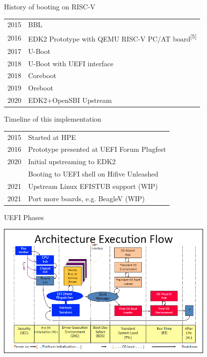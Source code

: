 \documentclass[
  10pt
]{beamer}
\begin{document}

% 

\begin{frame}{History of booting on RISC-V}
  \begin{tabular}{ll}
    2015 & BBL \\ %
    2016 & EDK2 Prototype with QEMU RISC-V PC/AT board\textsuperscript{\tiny [5]} \\
    2017 & U-Boot \\
    2018 & U-Boot with UEFI interface \\
    2018 & Coreboot \\
    2019 & Oreboot \\ %
    2020 & EDK2+OpenSBI Upstream \\
  \end{tabular}
\end{frame}

\begin{frame}{Timeline of this implementation}
  \begin{tabular}{ll}
    2015 & Started at HPE \\
    2016 & Prototype presented at UEFI Forum Plugfest \\
    2020 & Initial upstreaming to EDK2 \\
         & Booting to UEFI shell on Hifive Unleashed \\
    2021 & Upstream Linux EFISTUB support (WIP) \\
    2021 & Port more boards, e.g. BeagleV (WIP) \\
  \end{tabular}
\end{frame}

\begin{frame}{UEFI Phases}
  \begin{center}
    \includegraphics[width=0.8\textwidth]{resources/bootflow.png}
  \end{center}
\end{frame}
\end{document}

